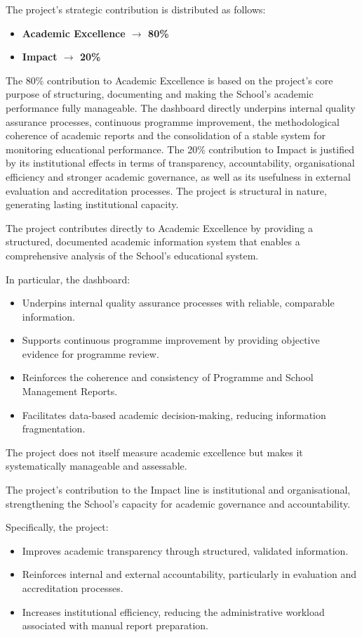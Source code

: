 \documentclass[11pt,a4paper]{scrreprt}
\begin{document}
\small
The project's strategic contribution is distributed as follows:
\begin{itemize}[noitemsep,topsep=2pt]
\item \textbf{Academic Excellence $\rightarrow$ 80\%}
\item \textbf{Impact $\rightarrow$ 20\%}
\end{itemize}
The 80\% contribution to Academic Excellence is based on the project's core purpose of structuring, documenting and making the School's academic performance fully manageable. The dashboard directly underpins internal quality assurance processes, continuous programme improvement, the methodological coherence of academic reports and the consolidation of a stable system for monitoring educational performance. The 20\% contribution to Impact is justified by its institutional effects in terms of transparency, accountability, organisational efficiency and stronger academic governance, as well as its usefulness in external evaluation and accreditation processes. The project is structural in nature, generating lasting institutional capacity.



\small
The project contributes directly to Academic Excellence by providing a structured, documented academic information system that enables a comprehensive analysis of the School's educational system.

In particular, the dashboard:
\begin{itemize}[noitemsep,topsep=2pt]
\item Underpins internal quality assurance processes with reliable, comparable information.
\item Supports continuous programme improvement by providing objective evidence for programme review.
\item Reinforces the coherence and consistency of Programme and School Management Reports.
\item Facilitates data-based academic decision-making, reducing information fragmentation.
\end{itemize}

The project does not itself measure academic excellence but makes it systematically manageable and assessable.


\small
The project's contribution to the Impact line is institutional and organisational, strengthening the School's capacity for academic governance and accountability.

Specifically, the project:
\begin{itemize}[noitemsep,topsep=2pt]
\item Improves academic transparency through structured, validated information.
\item Reinforces internal and external accountability, particularly in evaluation and accreditation processes.
\item Increases institutional efficiency, reducing the administrative workload associated with manual report preparation.
\end{itemize}
\end{document}
